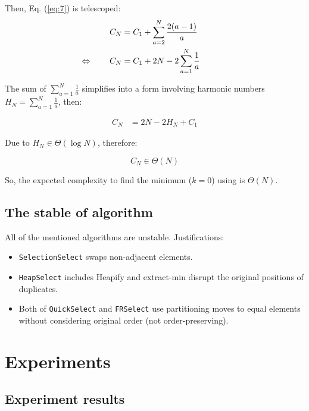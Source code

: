 \documentclass[acmconf,nonacm=true]{acmart}
\begin{document}
    Then, Eq. (\ref{eq:7}) is telescoped:
    \begin{align} \label{eq:8}
        C_N &= C_1 + \sum_{a=2}^{N} \frac{2(a-1)}{a} \\
        \llap{$\Leftrightarrow$ \qquad} C_N &= C_1 + 2N - 2 \sum_{a=1}^{N} \frac{1}{a}
    \end{align}

    The sum of $\sum_{a=1}^{N} \frac{1}{a}$ simplifies into a form involving harmonic numbers $H_N = \sum_{a=1}^{N} \frac{1}{a}$, then:

    \begin{align}
        C_N &= 2N - 2 H_N  + C_1
    \end{align}

    Due to $H_N \in \Theta (\log N)$, therefore:
    
    \begin{equation}
        C_N \in \Theta(N)
    \end{equation}

So, the expected complexity to find the minimum ($k = 0$) using  is $\Theta(N)$.

    
\subsection{The stable of algorithm}

All of the mentioned algorithms are unstable. Justifications:
\begin{itemize}
    \item \texttt{SelectionSelect} swaps non-adjacent elements.
    \item \texttt{HeapSelect} includes Heapify and extract-min disrupt the original positions of duplicates.
    \item Both of \texttt{QuickSelect} and \texttt{FRSelect} use partitioning moves to equal elements without considering original order (not order-preserving).
\end{itemize}




\newpage

\section{Experiments}

\subsection{Experiment results}
\end{document}
